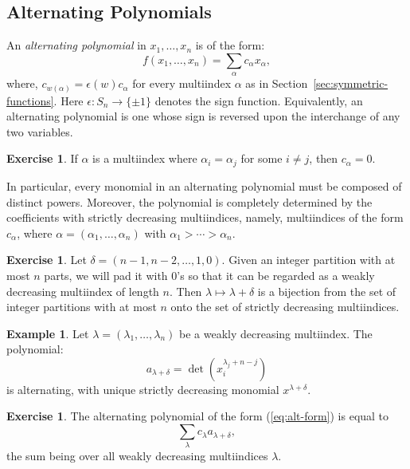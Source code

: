 \documentclass[11pt]{amsproc}
\theoremstyle{definition}
\theoremstyle{example}
\newtheorem{example}[theorem]{Example}
\newtheorem{exercise}[theorem]{Exercise}
\begin{document}
\subsection{Alternating Polynomials}
\label{sec:alt-poly}
An \emph{alternating polynomial} in $x_1,\dotsc, x_n$ is of the form:
\begin{equation}
  \label{eq:alt-form}
  f(x_1,\dotsc,x_n) = \sum_{\alpha} c_\alpha x_\alpha,
\end{equation}
where, $c_{w(\alpha)} = \epsilon(w)c_\alpha$ for every multiindex $\alpha$ as in Section~\ref{sec:symmetric-functions}.
Here $\epsilon:S_n\to \{\pm 1\}$ denotes the sign function.
Equivalently, an alternating polynomial is one whose sign is reversed upon the interchange of any two variables.
\begin{exercise}
  If $\alpha$ is a multiindex where $\alpha_i=\alpha_j$ for some $i\neq j$, then $c_\alpha = 0$.
\end{exercise}
In particular, every monomial in an alternating polynomial must be composed of distinct powers.
Moreover, the polynomial is completely determined by the coefficients with strictly decreasing multiindices, namely, multiindices of the form $c_\alpha$, where $\alpha=(\alpha_1,\dotsc,\alpha_n)$ with $\alpha_1>\dotsb>\alpha_n$.
\begin{exercise}
  Let $\delta=(n-1,n-2,\dotsc,1, 0)$.
  Given an integer partition with at most $n$ parts, we will pad it with $0$'s so that it can be regarded as a weakly decreasing multiindex of length $n$.
  Then $\lambda\mapsto \lambda+\delta$ is a bijection from the set of integer partitions with at most $n$ onto the set of strictly decreasing multiindices.
\end{exercise}
\begin{example}
  Let $\lambda = (\lambda_1,\dotsc, \lambda_n)$ be a weakly decreasing multiindex.
  The polynomial:
  \begin{displaymath}
    a_{\lambda+\delta} = \det(x_i^{\lambda_j + n - j})
  \end{displaymath}
  is alternating, with unique strictly decreasing monomial $x^{\lambda+\delta}$.
\end{example}
\begin{exercise}
  \label{exercise:alt-basis}
  The alternating polynomial of the form \textup{(\ref{eq:alt-form})} is equal to  \begin{displaymath}
    \sum_{\lambda} c_\lambda a_{\lambda+\delta},
  \end{displaymath}
  the sum being over all weakly decreasing multiindices $\lambda$.
\end{exercise}
\end{document}
